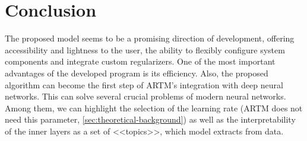 \documentclass{article}
\begin{document}
\section{\centering Conclusion}
The proposed model seems to be a promising direction of development, offering accessibility and lightness to the user, the ability to flexibly configure system components and integrate custom regularizers. One of the most important advantages of the developed program is its efficiency. Also, the proposed algorithm can become the first step of ARTM's integration with deep neural networks. This can solve several crucial problems of modern neural networks. Among them, we can highlight the selection of the learning rate (ARTM does not need this parameter, \ref{sec:theoretical-background}) as well as the interpretability of the inner layers as a set of <<topics>>, which model extracts from data.
\end{document}
